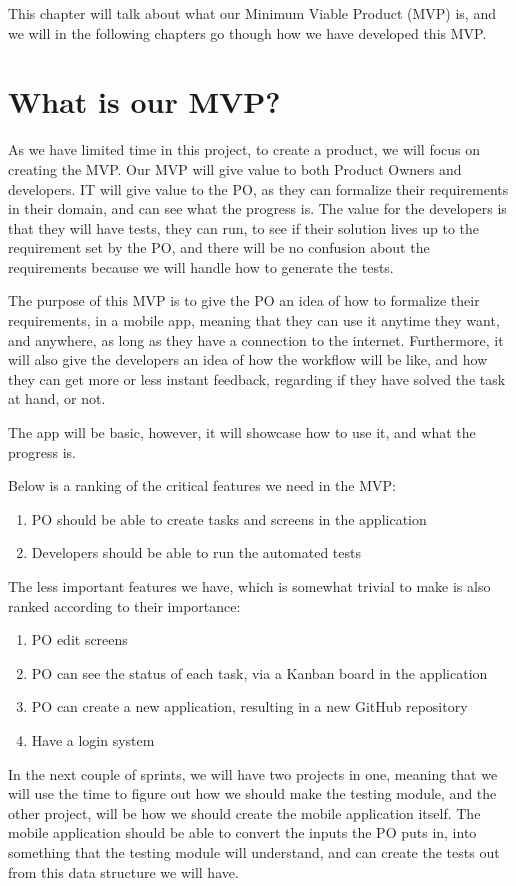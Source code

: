 This chapter will talk about what our Minimum Viable Product (MVP) is, and we will in the following chapters go though how we have developed this MVP.

\section{What is our MVP?}
As we have limited time in this project, to create a product, we will focus on creating the MVP.
Our MVP will give value to both Product Owners and developers.
IT will give value to the PO, as they can formalize their requirements in their domain, and can see what the progress is.
The value for the developers is that they will have tests, they can run, to see if their solution lives up to the requirement set by the PO, and there will be no confusion about the requirements because we will handle how to generate the tests. 

The purpose of this MVP is to give the PO an idea of how to formalize their requirements, in a mobile app, meaning that they can use it anytime they want, and anywhere, as long as they have a connection to the internet.
Furthermore, it will also give the developers an idea of how the workflow will be like, and how they can get more or less instant feedback, regarding if they have solved the task at hand, or not. 

The app will be basic, however, it will showcase how to use it, and what the progress is.

Below is a ranking of the critical features we need in the MVP:

\begin{enumerate}
    \item PO should be able to create tasks and screens in the application
    \item Developers should be able to run the automated tests
\end{enumerate}

The less important features we have, which is somewhat trivial to make is also ranked according to their importance:

\begin{enumerate}
    \item PO edit screens
    \item PO can see the status of each task, via a Kanban board in the application
    \item PO can create a new application, resulting in a new GitHub repository
    \item Have a login system
\end{enumerate}

In the next couple of sprints, we will have two projects in one, meaning that we will use the time to figure out how we should make the testing module, and the other project, will be how we should create the mobile application itself.
The mobile application should be able to convert the inputs the PO puts in, into something that the testing module will understand, and can create the tests out from this data structure we will have.